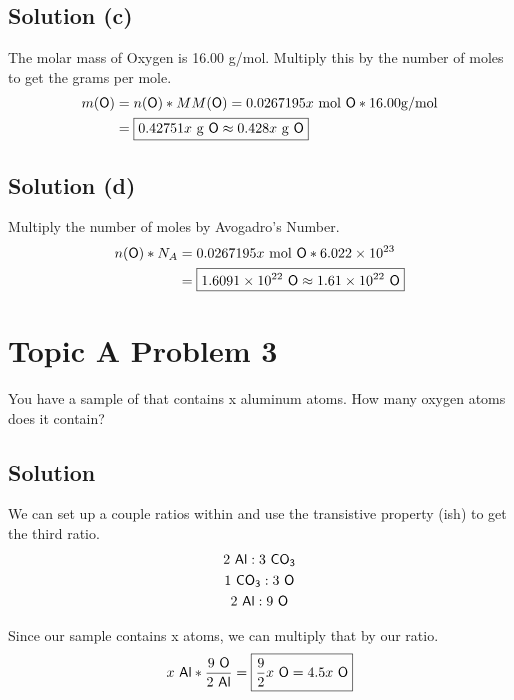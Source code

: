 \documentclass[10pt]{article}
\begin{document}
        \subsection{Solution (c)}
            The molar mass of Oxygen is 16.00 \unit{\gram/\mole}.
            Multiply this by the number of moles to get the grams per mole.
            \begin{align}
                m(\ce{O})   &=  n(\ce{O}) * MM(\ce{O})
                    =   0.0267195x\ \unit{\mole}\ \ce{O} * 16.00 \unit{\gram/\mole}\\
                    &=  \boxed{0.42751x\ \unit{\gram}\ \ce{O}
                    \approx 0.428x\ \unit{\gram}\ \ce{O}}
            \end{align}

        \subsection{Solution (d)}
            Multiply the number of moles by Avogadro's Number.
            \begin{align}
                n(\ce{O}) * N_A &=  0.0267195x\ \unit{\mole}\ \ce{O} * 6.022 \times 10^{23}\\
                    &=  \boxed{1.6091 \times 10^{22}\ \ce{O}
                    \approx 1.61 \times 10^{22}\ \ce{O}}
            \end{align}

    \pagebreak
    \section{Topic A Problem 3}
        You have a sample of  that contains x aluminum atoms. 
        How many oxygen atoms does it contain?

        \subsection{Solution}
            We can set up a couple ratios within  and use the transistive property (ish) to get the third ratio.
            \begin{gather}
                2\ \ce{Al} : 3\ \ce{CO3}\\
                1\ \ce{CO3} : 3\ \ce{O}\\
                2\ \ce{Al} : 9\ \ce{O}
            \end{gather}

            Since our sample contains x  atoms, we can multiply that by our ratio.
            \begin{equation}
                x\ \ce{Al} * \frac{9\ \ce{O}}{2\ \ce{Al}} = \boxed{\frac{9}{2}x\ \ce{O} = 4.5x\ \ce{O}}
            \end{equation}
\end{document}
